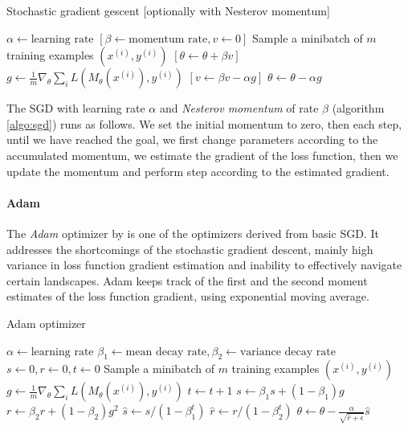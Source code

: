 \begin{algorithm}
\caption{Stochastic gradient gescent [optionally with Nesterov momentum]}
\label{algo:sgd}
\begin{algorithmic}
\STATE $\alpha \gets \text{learning rate}$
\STATE $\left[\beta \gets \text{momentum rate}, v \gets 0\right]$
\STATE
\REPEAT
\STATE Sample a minibatch of $m$ training examples $\left(x^{(i)}, y^{(i)}\right)$
\STATE $\left[\theta \gets \theta + \beta v\right]$
\STATE $g \gets \frac{1}{m} \nabla_\theta \sum_i L\left(M_\theta\left(x^{(i)}\right),y^{(i)}\right)$
\STATE $\left[v \gets \beta v - \alpha g\right]$
\STATE $\theta \gets \theta - \alpha g$
\end{algorithmic}
\end{algorithm}

\noindent The SGD with learning rate $\alpha$ and \emph{Nesterov momentum} of rate $\beta$ (algorithm \ref{algo:sgd}) runs as follows. We set the initial momentum to zero, then each step, until we have reached the goal, we first change parameters according to the accumulated momentum, we estimate the gradient of the loss function, then we update the momentum and perform step according to the estimated gradient.

\paragraph{Adam}
\label{sec:adam}

The \emph{Adam} optimizer by \cite{DBLP:journals/corr/KingmaB14} is one of the optimizers derived from basic SGD. It addresses the shortcomings of the stochastic gradient descent, mainly high variance in loss function gradient estimation and inability to effectively navigate certain landscapes. Adam keeps track of the first and the second moment estimates of the loss function gradient, using exponential moving average.

\begin{algorithm}
\caption{Adam optimizer}
\label{algo:adam}
\begin{algorithmic}
\STATE $\alpha \gets \text{learning rate}$
\STATE $\beta_1 \gets \text{mean decay rate}, \beta_2 \gets \text{variance decay rate}$
\STATE
\STATE $s \gets 0, r \gets 0, t \gets 0$
\REPEAT
\STATE Sample a minibatch of $m$ training examples $\left(x^{(i)}, y^{(i)}\right)$
\STATE $g \gets \frac{1}{m} \nabla_\theta \sum_i L\left(M_\theta\left(x^{(i)}\right),y^{(i)}\right)$
\STATE $t \gets t + 1$
\STATE $s \gets \beta_1 s + \left(1 - \beta_1\right)g$
\STATE $r \gets \beta_2 r + \left(1 - \beta_2\right)g^2$
\STATE $\hat{s} \gets s / \left(1 - \beta_1^t\right)$
\STATE $\hat{r} \gets r / \left(1 - \beta_2^t\right)$
\STATE $\theta \gets \theta - \frac{\alpha}{\sqrt{\hat{r} + \epsilon}} \hat{s}$
\end{algorithmic}
\end{algorithm}

